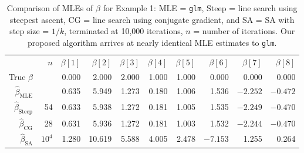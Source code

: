 \documentclass[oneside]{myumnStatThesis}
\begin{document}
\begin{table}
\caption{Comparison of MLEs of $\beta$ for Example 1: MLE = \texttt{glm}, Steep = line search using steepest ascent, 
CG = line search using conjugate gradient, and SA =  SA with step size = $1/k$, terminated at 10,000 iterations,
$n$ = number of iterations.  Our 
proposed algorithm arrives at nearly identical MLE estimates to \texttt{glm}.}
\begin{center}
\begin{tabular}{rrrrrrrrrr}
  \hline
 & $n$ & $\beta[1]$ & $\beta[2]$ & $\beta[3]$ & $\beta[4]$ & $\beta[5]$ & $\beta[6]$ & $\beta[7]$ & $\beta[8]$ \\ 
True $\beta$ & & 0.000 & 2.000 & 2.000 & 1.000 & 1.000 & 0.000 & 0.000 & 0.000 \\ 
  $\hat{\beta}_{\textrm{MLE}}$ & & 0.635 & 5.949 & 1.273 & 0.180 & 1.006 & 1.536 & $-2.252$ & $-0.472$ \\ 
  $\hat{\beta}_{\textrm{Steep}}$ & 54 & 0.633 & 5.938 & 1.272 & 0.181 & 1.005 & 1.535 & $-2.249$ & $-0.470$ \\ 
  $\hat{\beta}_{\textrm{CG}}$ & 28 & 0.631 & 5.936 & 1.272 & 0.181 & 1.003 & 1.532 & $-2.244$ & $-0.470$ \\    
  $\hat{\beta}_{\textrm{SA}}$ & $10^4$ & 1.280 & 10.619 & 5.588 & 4.005 & 2.478 & $-7.153$ & 1.255 & 0.264 \\ 
  \hline
\end{tabular}
\end{center}
\label{Table:Logistic}
\end{table}
\end{document}
